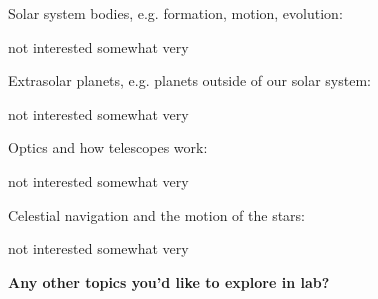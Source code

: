 \documentclass[12pt]{article}
\begin{document}
\vspace{0.1in}

Solar system bodies, e.g. formation, motion, evolution:
\begin{center}
	not interested \hspace{0.3in} somewhat \hspace{0.3in} very
\end{center}

\vspace{0.1in}

Extrasolar planets, e.g. planets outside of our solar system:
\begin{center}
	not interested \hspace{0.3in} somewhat \hspace{0.3in} very
\end{center}

\vspace{0.1in}

Optics and how telescopes work:
\begin{center}
	not interested \hspace{0.3in} somewhat \hspace{0.3in} very
\end{center}

\vspace{0.1in}

Celestial navigation and the motion of the stars:
\begin{center}
	not interested \hspace{0.3in} somewhat \hspace{0.3in} very
\end{center}

\vspace{0.2in}
\noindent\textbf{Any other topics you'd like to explore in lab?}
\vspace{0.4in}


	




\end{document}
